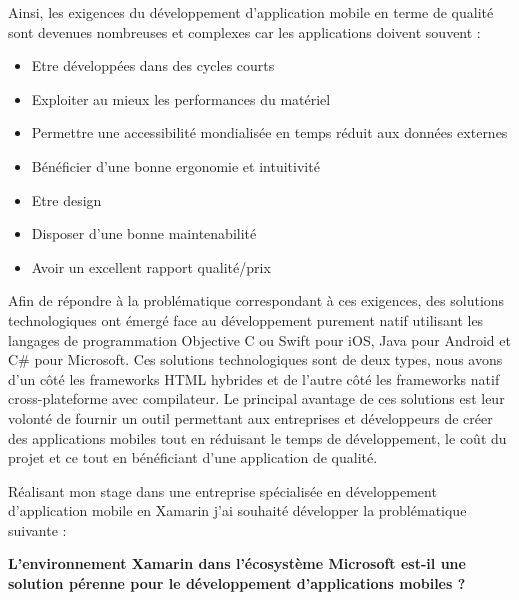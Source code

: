 \documentclass[11]{article}
\begin{document}
\vspace{0.5cm}

Ainsi, les exigences du développement d’application mobile en terme de qualité sont devenues nombreuses et complexes car les applications doivent souvent :

\begin{itemize}
\item Etre développées dans des cycles courts
\item Exploiter au mieux les performances du matériel
\item Permettre une accessibilité mondialisée en temps réduit aux données externes
\item Bénéficier d’une bonne ergonomie et intuitivité
\item Etre design
\item Disposer d’une bonne maintenabilité
\item Avoir un excellent rapport qualité/prix
\end{itemize}

\vspace{0.5cm}

Afin de répondre à la problématique correspondant à ces exigences, des solutions technologiques ont émergé face au développement purement natif utilisant les langages de programmation Objective C ou Swift pour iOS, Java pour Android et C\# pour Microsoft. 
Ces solutions technologiques sont de deux types, nous avons d’un côté les frameworks HTML hybrides et de l’autre côté les frameworks natif cross-plateforme avec compilateur. Le principal avantage de ces solutions est leur volonté de fournir un outil permettant aux entreprises et développeurs de créer des applications mobiles tout en réduisant le temps de développement, le coût du projet et ce tout en bénéficiant d’une application de qualité.

\vspace{0.5cm}

Réalisant mon stage dans une entreprise spécialisée en développement d’application mobile en Xamarin j’ai souhaité développer la problématique suivante : 

\vspace{0.5cm}
 
 \begin{center}
\textbf{L’environnement Xamarin dans l'écosystème Microsoft 
est-il une solution pérenne pour le développement d’applications mobiles ?}
\end{center}

\vspace{0.5cm}
\end{document}

